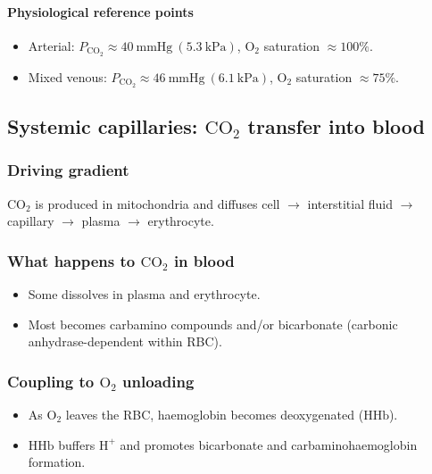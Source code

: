 \documentclass[11pt,a4paper]{article}
\begin{document}
\paragraph{Physiological reference points}
\begin{itemize}
  \item Arterial: \(P_{\mathrm{CO_2}} \approx 40~\mathrm{mmHg}~(5.3~\mathrm{kPa})\), \(\mathrm{O_2}\) saturation \(\approx 100\%\).
  \item Mixed venous: \(P_{\mathrm{CO_2}} \approx 46~\mathrm{mmHg}~(6.1~\mathrm{kPa})\), \(\mathrm{O_2}\) saturation \(\approx 75\%\).
\end{itemize}

\subsection{Systemic capillaries: \(\mathrm{CO_2}\) transfer into blood}
\subsubsection{Driving gradient}
\(\mathrm{CO_2}\) is produced in mitochondria and diffuses cell \(\rightarrow\) interstitial fluid \(\rightarrow\) capillary \(\rightarrow\) plasma \(\rightarrow\) erythrocyte.

\subsubsection{What happens to \(\mathrm{CO_2}\) in blood}
\begin{itemize}
  \item Some dissolves in plasma and erythrocyte.
  \item Most becomes carbamino compounds and/or bicarbonate (carbonic anhydrase-dependent within RBC).
\end{itemize}

\subsubsection{Coupling to \(\mathrm{O_2}\) unloading}
\begin{itemize}
  \item As \(\mathrm{O_2}\) leaves the RBC, haemoglobin becomes deoxygenated (\(\mathrm{HHb}\)).
  \item \(\mathrm{HHb}\) buffers \(\mathrm{H^+}\) and promotes bicarbonate and carbaminohaemoglobin formation.
\end{itemize}
\end{document}
